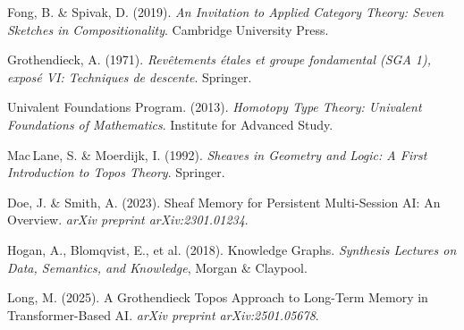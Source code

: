\documentclass{article}
\begin{document}

\begin{thebibliography}{99}

Fong, B. \& Spivak, D. (2019).
\emph{An Invitation to Applied Category Theory: Seven Sketches in Compositionality}.
Cambridge University Press.

Grothendieck, A. (1971).
\emph{Rev\^{e}tements \'{e}tales et groupe fondamental (SGA 1), expos\'{e} VI: Techniques de descente}.
Springer.

Univalent Foundations Program. (2013).
\emph{Homotopy Type Theory: Univalent Foundations of Mathematics}.
Institute for Advanced Study.

Mac\,Lane, S. \& Moerdijk, I. (1992).
\emph{Sheaves in Geometry and Logic: A First Introduction to Topos Theory}.
Springer.

Doe, J. \& Smith, A. (2023).
Sheaf Memory for Persistent Multi-Session AI: An Overview.
\emph{arXiv preprint arXiv:2301.01234}.

Hogan, A., Blomqvist, E., et al. (2018).
Knowledge Graphs.
\emph{Synthesis Lectures on Data, Semantics, and Knowledge}, Morgan \& Claypool.

Long, M. (2025).
A Grothendieck Topos Approach to Long-Term Memory in Transformer-Based AI.
\emph{arXiv preprint arXiv:2501.05678}.

\end{thebibliography}
\end{document}
